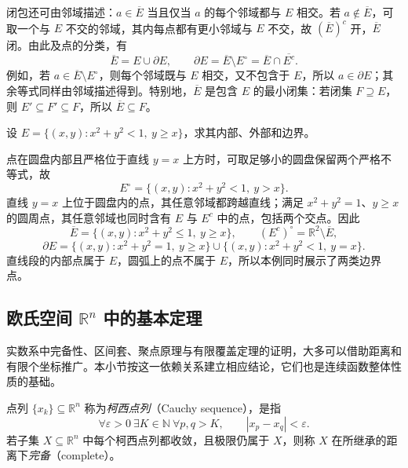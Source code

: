 闭包还可由邻域描述：$a\in\overline E$ 当且仅当 $a$ 的每个邻域都与 $E$ 相交。若 $a\notin\overline E$，可取一个与 $E$ 不交的邻域，其内每点都有更小邻域与 $E$ 不交，故 $(\overline E)^c$ 开，$\overline E$ 闭。由此及点的分类，有
\begin{equation}
    \overline E=E\cup\partial E,
    \qquad \partial E=\overline E\setminus E^\circ
                      =\overline E\cap\overline{E^c}.
    \label{eq:euclidean-closure-boundary-identities}
\end{equation}
例如，若 $a\in\overline E\setminus E^\circ$，则每个邻域既与 $E$ 相交，又不包含于 $E$，所以 $a\in\partial E$；其余等式同样由邻域描述得到。特别地，$\overline E$ 是包含 $E$ 的最小闭集：若闭集 $F\supseteq E$，则 $E'\subseteq F'\subseteq F$，所以 $\overline E\subseteq F$。

\begin{example}
\label{ex:half-open-disk-interior-boundary}
设 $E=\{(x,y):x^2+y^2<1,\ y\geq x\}$，求其内部、外部和边界。
\end{example}

\begin{solve}
点在圆盘内部且严格位于直线 $y=x$ 上方时，可取足够小的圆盘保留两个严格不等式，故
\[
    E^\circ=\{(x,y):x^2+y^2<1,\ y>x\}.
\]
直线 $y=x$ 上位于圆盘内的点，其任意邻域都跨越直线；满足 $x^2+y^2=1$、$y\geq x$ 的圆周点，其任意邻域也同时含有 $E$ 与 $E^c$ 中的点，包括两个交点。因此
\[
    \overline E=\{(x,y):x^2+y^2\leq1,\ y\geq x\},\qquad
    (E^c)^\circ=\mathbb R^2\setminus\overline E,
\]
\[
    \partial E=\{(x,y):x^2+y^2=1,\ y\geq x\}
          \cup\{(x,y):x^2+y^2<1,\ y=x\}.
\]
直线段的内部点属于 $E$，圆弧上的点不属于 $E$，所以本例同时展示了两类边界点。
\end{solve}

\subsection{欧氏空间 \texorpdfstring{$\mathbb{R}^n$}{R^n} 中的基本定理}
\label{subsec:fundamental-theorems-of-euclidean-space}

实数系中完备性、区间套、聚点原理与有限覆盖定理的证明，大多可以借助距离和有限个坐标推广。本小节按这一依赖关系建立相应结论，它们也是连续函数整体性质的基础。

\begin{definition}
\label{def:euclidean-cauchy-sequence-completeness}
点列 $\{x_k\}\subseteq\mathbb R^n$ 称为\emph{柯西点列}（Cauchy sequence），是指
\[
    \forall\varepsilon>0\ \exists K\in\mathbb N\ \forall p,q>K,
    \qquad |x_p-x_q|<\varepsilon.
\]
若子集 $X\subseteq\mathbb R^n$ 中每个柯西点列都收敛，且极限仍属于 $X$，则称 $X$ 在所继承的距离下\emph{完备}（complete）。
\end{definition}

